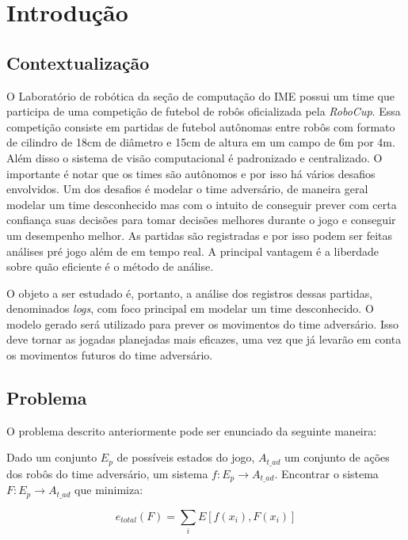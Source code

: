 \chapter{Introdução}

\section{Contextualização}

\par O Laboratório de robótica da seção de computação do IME possui um time que
participa de uma competição de futebol de robôs oficializada pela \textit{RoboCup}.
Essa competição consiste em partidas de futebol autônomas entre robôs com formato
de cilindro de 18cm de diâmetro e 15cm de altura em um campo de 6m por 4m. Além disso
o sistema de visão computacional é padronizado e centralizado. O importante é notar
que os times são autônomos e por isso há vários desafios envolvidos.
Um dos desafios é modelar o time adversário, de maneira geral modelar um time desconhecido
mas com o intuito de conseguir prever com certa confiança suas decisões para tomar
decisões melhores durante o jogo e conseguir um desempenho melhor.
As partidas são registradas e por isso podem ser feitas análises pré jogo além
de em tempo real. A principal vantagem é a liberdade sobre quão eficiente é o método
de análise.

\par O objeto a ser estudado é, portanto, a análise dos registros dessas partidas,
denominados \textit{logs}, com foco principal em modelar um time desconhecido. O modelo 
gerado será utilizado para prever os movimentos do time adversário. Isso deve tornar 
as jogadas planejadas mais  eficazes, uma vez que já levarão em conta os movimentos 
futuros do time adversário.

\section{Problema}

O problema descrito anteriormente pode ser enunciado da seguinte maneira:

Dado um conjunto $E_p$ de possíveis estados do jogo, $A_{t\_ad}$ um conjunto de ações dos robôs
do time adversário, um sistema $f: {E_p} \rightarrow {A_{t\_ad}}$. Encontrar o sistema 
$F: {E_p} \rightarrow {A_{t\_ad}}$ que minimiza:

\begin{equation}
e_{total}(F) = \sum_i E[f(x_i),F(x_i)]
\end{equation}

